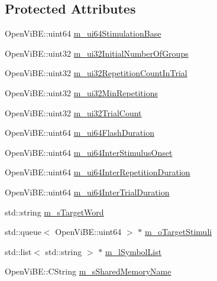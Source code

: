 \subsection*{Protected Attributes}
\begin{DoxyCompactItemize}
\item 
OpenViBE::uint64 \hyperlink{classOpenViBEApplications_1_1P300StimulatorPropertyReader_a55f615f0b7d7297231df65e3d73b3498}{m\_\-ui64StimulationBase}
\item 
OpenViBE::uint32 \hyperlink{classOpenViBEApplications_1_1P300StimulatorPropertyReader_ab7fa74be1b80d032c19b4eaad3678919}{m\_\-ui32InitialNumberOfGroups}
\item 
OpenViBE::uint32 \hyperlink{classOpenViBEApplications_1_1P300StimulatorPropertyReader_a4056faf7810d59f44faebf81e15b6a6d}{m\_\-ui32RepetitionCountInTrial}
\item 
OpenViBE::uint32 \hyperlink{classOpenViBEApplications_1_1P300StimulatorPropertyReader_a4ff9153b30db0122af7bad5d5079312d}{m\_\-ui32MinRepetitions}
\item 
OpenViBE::uint32 \hyperlink{classOpenViBEApplications_1_1P300StimulatorPropertyReader_aa53eadbc7f152f562cf52566ba7507f2}{m\_\-ui32TrialCount}
\item 
OpenViBE::uint64 \hyperlink{classOpenViBEApplications_1_1P300StimulatorPropertyReader_a575e5f53bacd17b503166677387598ae}{m\_\-ui64FlashDuration}
\item 
OpenViBE::uint64 \hyperlink{classOpenViBEApplications_1_1P300StimulatorPropertyReader_a86d951b44b4566b27faee7c696ffa5cd}{m\_\-ui64InterStimulusOnset}
\item 
OpenViBE::uint64 \hyperlink{classOpenViBEApplications_1_1P300StimulatorPropertyReader_a792a3f366ed7a5ff2aa6f0379de62c56}{m\_\-ui64InterRepetitionDuration}
\item 
OpenViBE::uint64 \hyperlink{classOpenViBEApplications_1_1P300StimulatorPropertyReader_ae1e6b9329a5596f3d115588e916d1367}{m\_\-ui64InterTrialDuration}
\item 
std::string \hyperlink{classOpenViBEApplications_1_1P300StimulatorPropertyReader_aaba34c036411490932aef621463627fd}{m\_\-sTargetWord}
\item 
std::queue$<$ OpenViBE::uint64 $>$ $\ast$ \hyperlink{classOpenViBEApplications_1_1P300StimulatorPropertyReader_ad29683052db3cca979eef5c818abcdee}{m\_\-oTargetStimuli}
\item 
std::list$<$ std::string $>$ $\ast$ \hyperlink{classOpenViBEApplications_1_1P300StimulatorPropertyReader_a505acf30602a11938fef140b51c2fb8b}{m\_\-lSymbolList}
\item 
OpenViBE::CString \hyperlink{classOpenViBEApplications_1_1P300StimulatorPropertyReader_a84c3d873b2ce60d77622f6e68635df44}{m\_\-sSharedMemoryName}
\end{DoxyCompactItemize}
